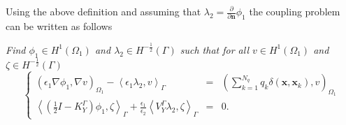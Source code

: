 Using the above definition and assuming that $\lambda_2  = \frac{\partial}{\partial \mathbf{n}} \phi_1 $ the coupling problem can be written as follows
\begin{center}
  \textit{Find $ \phi_1 \in H^1(\Omega_1)$ and $\lambda_2 \in H^{-\frac{1}{2}}(\Gamma)$ such that for all $v \in H^1(\Omega_1)$ and $\zeta \in H^{-\frac{1}{2}}(\Gamma)$}
\begin{equation} 
\label{eq:standard_fem_bem}
 \left\{
 \begin{array}{rcl}
 \left(  \epsilon_1 \nabla \phi_1, \nabla v \right)_{\Omega_1}  - \left< \epsilon_1 \lambda_2, v \right>_\Gamma &=&   \left(  \sum_{k=1}^{N_q} q_k\delta(\mathbf{x},\mathbf{x}_k),  v \right)_{\Omega_1} \\[3mm] 
  \left< \left(\tfrac{1}{2} I - K_{Y}^{\Gamma}\right) \phi_1, \zeta \right>_\Gamma + \tfrac{\epsilon_1}{\epsilon_2} \left< V_{Y}^{\Gamma} \lambda_2, \zeta \right>_\Gamma &=&0.
  \end{array}
  \right.
\end{equation}
\end{center}



